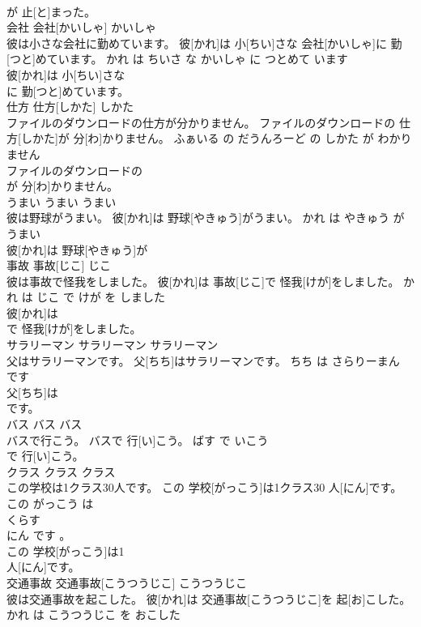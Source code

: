 \documentclass[8pt]{extreport}
\begin{document}
\begin{CJK}{UTF8}{min}
\\	が 止[と]まった。			
\\	会社	会社[かいしゃ]	かいしゃ	
\\	彼は小さな会社に勤めています。	彼[かれ]は 小[ちい]さな 会社[かいしゃ]に 勤[つと]めています。	かれ は ちいさ な かいしゃ に つとめて います	
\\	彼[かれ]は 小[ちい]さな
\\	に 勤[つと]めています。			
\\	仕方	仕方[しかた]	しかた	
\\	ファイルのダウンロードの仕方が分かりません。	ファイルのダウンロードの 仕方[しかた]が 分[わ]かりません。	ふぁいる の だうんろーど の しかた が わかりません	
\\	ファイルのダウンロードの
\\	が 分[わ]かりません。			
\\	うまい	うまい	うまい	
\\	彼は野球がうまい。	彼[かれ]は 野球[やきゅう]がうまい。	かれ は やきゅう が うまい	
\\	彼[かれ]は 野球[やきゅう]が
\\	事故	事故[じこ]	じこ	
\\	彼は事故で怪我をしました。	彼[かれ]は 事故[じこ]で 怪我[けが]をしました。	かれ は じこ で けが を しました	
\\	彼[かれ]は
\\	で 怪我[けが]をしました。			
\\	サラリーマン	サラリーマン	サラリーマン	
\\	父はサラリーマンです。	父[ちち]はサラリーマンです。	ちち は さらりーまん です	
\\	父[ちち]は
\\	です。			
\\	バス	バス	バス	
\\	バスで行こう。	バスで 行[い]こう。	ばす で いこう	
\\	で 行[い]こう。			
\\	クラス	クラス	クラス	
\\	この学校は1クラス30人です。	この 学校[がっこう]は1クラス30 人[にん]です。	この がっこう は 
\\	くらす 
\\	にん です 。	
\\	この 学校[がっこう]は1
\\	人[にん]です。			
\\	交通事故	交通事故[こうつうじこ]	こうつうじこ	
\\	彼は交通事故を起こした。	彼[かれ]は 交通事故[こうつうじこ]を 起[お]こした。	かれ は こうつうじこ を おこした	

\end{CJK}
\end{document}
